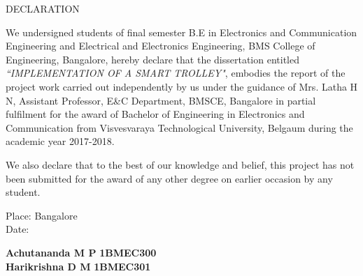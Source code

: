 {\fontsize{16pt}{19.2pt}\selectfont\bf{\begin{center}
DECLARATION
\end{center}}}

\vspace*{1cm}

We undersigned students of final semester B.E in Electronics and Communication Engineering and Electrical and Electronics Engineering, BMS College of Engineering, Bangalore, hereby declare that the dissertation entitled \textit{``IMPLEMENTATION OF A SMART TROLLEY"}, embodies the report of the project work carried out independently by us under the guidance of Mrs. Latha H N, Assistant Professor,  E\&C Department, BMSCE, Bangalore in partial fulfilment for the award of Bachelor of Engineering in Electronics and Communication from Visvesvaraya Technological University, Belgaum during the academic year 2017-2018.

We also declare that to the best of our knowledge and belief, this project has not been submitted for the award of any other degree on earlier occasion by any student.

\vspace*{1cm}

\begin{flushleft}
Place: Bangalore \\
Date: \date{\today{}}
\end{flushleft}

\vspace*{1cm}

\begin{flushright}
{\fontsize{14pt}{16.8pt}\selectfont\textbf{Achutananda M P}}  \hspace*{12mm} {\fontsize{14pt}{16.8pt}\selectfont\textbf{1BMEC300}}\\
\vspace*{3mm}
{\fontsize{14pt}{16.8pt}\selectfont\textbf{Harikrishna D M}}  \hspace*{12mm} {\fontsize{14pt}{16.8pt}\selectfont\textbf{1BMEC301}}\\
\end{flushright}


